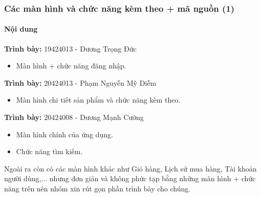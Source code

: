 \documentclass{beamer}
\begin{document}
\begin{frame}
    \frametitle{Các màn hình và chức năng kèm theo + mã nguồn (1)}
    \framesubtitle{Nội dung}
    \begin{flushleft}
        \large{\textbf{Trình bày: } 19424013 - Dương Trọng Đức}
        \begin{itemize}
            \item Màn hình + chức năng đăng nhập.
        \end{itemize}
    \end{flushleft}

    \begin{flushleft}
        \large{\textbf{Trình bày: } 20424013 - Phạm Nguyễn Mỹ Diễm}
        \begin{itemize}
            \item Màn hình chi tiết sản phẩm và chức năng kèm theo.
        \end{itemize}
    \end{flushleft}

    \begin{flushleft}
        \large{\textbf{Trình bày: } 20424008 - Dương Mạnh Cường}
        \begin{itemize}
            \item Màn hình chính của ứng dụng.
            \item Chức năng tìm kiếm.
        \end{itemize}
    \end{flushleft}

    \begin{flushleft}
        Ngoài ra còn có các màn hình khác như \textsf{\color{teal} Giỏ hàng, Lịch sử mua hàng, Tài khoản người dùng,...} nhưng đơn giản và không phức tạp bằng những màn hình + chức năng trên nên nhóm xin rút gọn phần trình bày cho chúng.
    \end{flushleft}
\end{frame}
\end{document}
